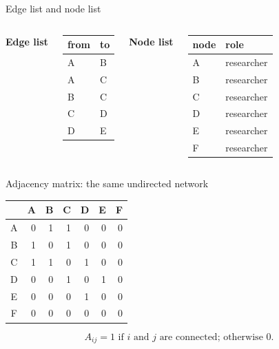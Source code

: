 \documentclass[aspectratio=169,11pt]{beamer}
\begin{document}
\begin{frame}{Edge list and node list}
\begin{columns}[t]
\centering\textbf{Edge list}
\begin{center}
\renewcommand{\arraystretch}{1.3}
\begin{tabular}{ll}
\toprule
from & to \\
\midrule
A & B \\
A & C \\
B & C \\
C & D \\
D & E \\
\bottomrule
\end{tabular}
\end{center}

\centering\textbf{Node list}
\begin{center}
\renewcommand{\arraystretch}{1.3}
\begin{tabular}{ll}
\toprule
node & role \\
\midrule
A & researcher \\
B & researcher \\
C & researcher \\
D & researcher \\
E & researcher \\
F & researcher \\
\bottomrule
\end{tabular}
\end{center}
\end{columns}
\end{frame}

\begin{frame}{Adjacency matrix: the same undirected network}
\begin{center}
\renewcommand{\arraystretch}{1.3}
\begin{tabular}{c|rrrrrr}
\toprule
 & A & B & C & D & E & F \\
\midrule
A & 0 & 1 & 1 & 0 & 0 & 0 \\
B & 1 & 0 & 1 & 0 & 0 & 0 \\
C & 1 & 1 & 0 & 1 & 0 & 0 \\
D & 0 & 0 & 1 & 0 & 1 & 0 \\
E & 0 & 0 & 0 & 1 & 0 & 0 \\
F & 0 & 0 & 0 & 0 & 0 & 0 \\
\bottomrule
\end{tabular}
\end{center}
\[A_{ij}=1\text{ if }i\text{ and }j\text{ are connected; otherwise }0.\]
\end{frame}
\end{document}
